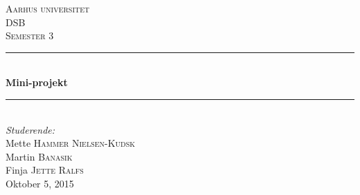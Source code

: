 \documentclass[12pt, letterpaper]{article}
\begin{document}
\begin{titlepage}

\newcommand{\HRule}{\rule{\linewidth}{0.5mm}} %

\center %
 

\textsc{\LARGE Aarhus universitet}\\[1.5cm] %
\textsc{\Large DSB}\\[0.5cm] %
\textsc{\large Semester 3}\\[0.5cm] %


\HRule \\[0.4cm]
{ \huge \bfseries Mini-projekt}\\[0.4cm] %
\HRule \\[1.5cm]
 

\Large \emph{Studerende:}\\[1cm]
Mette \textsc{Hammer Nielsen-Kudsk}\\[0,5cm] %
Martin \textsc{Banasik}\\[0,5cm] %
Finja \textsc{Jette Ralfs}\\[0,5cm] %

{\large Oktober 5, 2015}\\[1,2cm] %



\end{titlepage}
\end{document}
